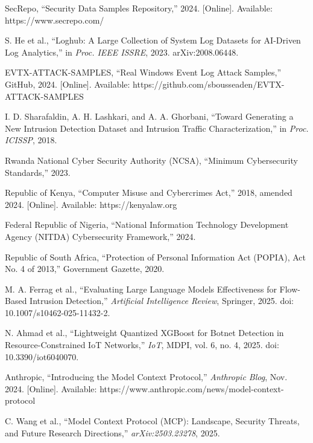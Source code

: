 \documentclass[12pt]{article}
\begin{document}
\begin{enumerate}[leftmargin=*, label={[\arabic*]}]

\item SecRepo, ``Security Data Samples Repository,'' 2024. [Online]. Available: https://www.secrepo.com/

\item S. He et al., ``Loghub: A Large Collection of System Log Datasets for AI-Driven Log Analytics,'' in \textit{Proc. IEEE ISSRE}, 2023. arXiv:2008.06448.

\item EVTX-ATTACK-SAMPLES, ``Real Windows Event Log Attack Samples,'' GitHub, 2024. [Online]. Available: https://github.com/sbousseaden/EVTX-ATTACK-SAMPLES

\item I. D. Sharafaldin, A. H. Lashkari, and A. A. Ghorbani, ``Toward Generating a New Intrusion Detection Dataset and Intrusion Traffic Characterization,'' in \textit{Proc. ICISSP}, 2018.

\item Rwanda National Cyber Security Authority (NCSA), ``Minimum Cybersecurity Standards,'' 2023.

\item Republic of Kenya, ``Computer Misuse and Cybercrimes Act,'' 2018, amended 2024. [Online]. Available: https://kenyalaw.org

\item Federal Republic of Nigeria, ``National Information Technology Development Agency (NITDA) Cybersecurity Framework,'' 2024.

\item Republic of South Africa, ``Protection of Personal Information Act (POPIA), Act No. 4 of 2013,'' Government Gazette, 2020.

\item M. A. Ferrag et al., ``Evaluating Large Language Models Effectiveness for Flow-Based Intrusion Detection,'' \textit{Artificial Intelligence Review}, Springer, 2025. doi: 10.1007/s10462-025-11432-2.

\item N. Ahmad et al., ``Lightweight Quantized XGBoost for Botnet Detection in Resource-Constrained IoT Networks,'' \textit{IoT}, MDPI, vol. 6, no. 4, 2025. doi: 10.3390/iot6040070.

\item Anthropic, ``Introducing the Model Context Protocol,'' \textit{Anthropic Blog}, Nov. 2024. [Online]. Available: https://www.anthropic.com/news/model-context-protocol

\item C. Wang et al., ``Model Context Protocol (MCP): Landscape, Security Threats, and Future Research Directions,'' \textit{arXiv:2503.23278}, 2025.

\end{enumerate}
\end{document}
